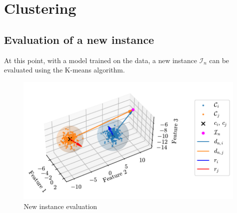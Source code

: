 \chapter{Clustering}

\section{Evaluation of a new instance}

At this point, with a model trained on the data, a new instance $\mathcal{I}_n$ can be evaluated using the K-means algorithm.


\begin{figure}[htbp]
  \centering
  \includegraphics[width=\textwidth]{images/Spheres_2.pdf}
\caption{New instance evaluation}
\label{fig:clust_spheres}
\end{figure}